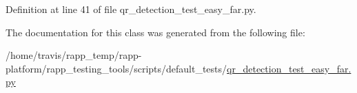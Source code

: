 Definition at line 41 of file qr\-\_\-detection\-\_\-test\-\_\-easy\-\_\-far.\-py.



The documentation for this class was generated from the following file\-:\begin{DoxyCompactItemize}
\item 
/home/travis/rapp\-\_\-temp/rapp-\/platform/rapp\-\_\-testing\-\_\-tools/scripts/default\-\_\-tests/\hyperlink{qr__detection__test__easy__far_8py}{qr\-\_\-detection\-\_\-test\-\_\-easy\-\_\-far.\-py}\end{DoxyCompactItemize}
